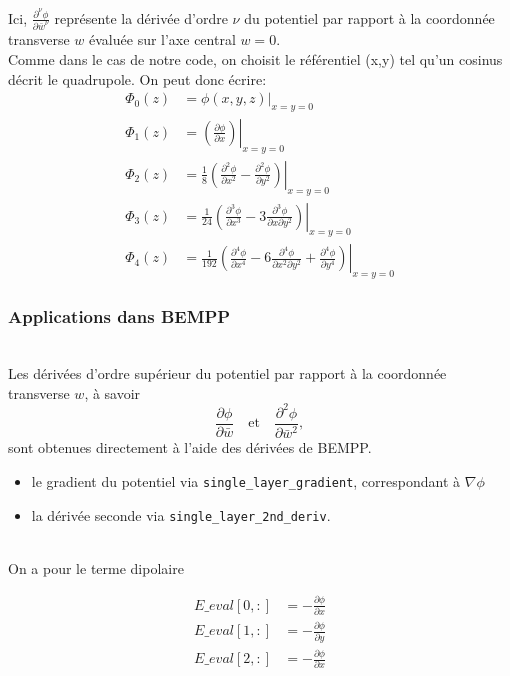 \documentclass{report}
\begin{document}
Ici, $\frac{\partial^{\nu} \phi}{\partial \bar w^{\nu}}$ représente la dérivée d'ordre $\nu$ du potentiel par rapport à la coordonnée transverse $w$ évaluée sur l'axe central $w=0$.  
\
\\
Comme dans le cas de notre code, on choisit le référentiel (x,y) tel qu'un cosinus décrit le quadrupole. On peut donc écrire:
\\
\[
\begin{aligned}
\Phi_0(z) &= \phi(x,y,z)\big|_{x=y=0} \\[1em]
\Phi_1(z) &=\left.\left(\frac{\partial \phi}{\partial x}\right)\right|_{x=y=0} \\[1em]
\Phi_2(z) &=\left.\frac{1}{8}\left(\frac{\partial^{2} \phi}{\partial x^{2}}-\frac{\partial^{2} \phi}{\partial y^{2}}\right)\right|_{x=y=0} \\[1em]
\Phi_3(z) &=\left.\frac{1}{24}\left(\frac{\partial^{3} \phi}{\partial x^{3}}-3 \frac{\partial^{3} \phi}{\partial x \partial y^{2}}\right)\right|_{x=y=0} \\[1em]
\Phi_4(z) &=\left.\frac{1}{192}\left(\frac{\partial^{4} \phi}{\partial x^{4}}-6 \frac{\partial^{4} \phi}{\partial x^{2} \partial y^{2}}+\frac{\partial^{4} \phi}{\partial y^{4}}\right)\right|_{x=y=0}
\end{aligned}
\]
\subsubsection{Applications dans BEMPP}
\
\\
Les dérivées d’ordre supérieur du potentiel par rapport à la coordonnée transverse $w$, à savoir
\[
\frac{\partial \phi}{\partial \bar w}
\quad \text{et} \quad
\frac{\partial^2 \phi}{\partial \bar w^2},
\]
sont obtenues directement à l’aide des dérivées de BEMPP.
\
\\
\begin{itemize}
  \item le gradient du potentiel via \texttt{single\_layer\_gradient}, correspondant à $\nabla \phi$ 
  \item la dérivée seconde via \texttt{single\_layer\_2nd\_deriv}.
\end{itemize}
\
\\
On a pour le terme dipolaire 

\begin{align*}
E\_eval[0, :]  &= -\frac{\partial \phi}{\partial x} \\
E\_eval[1, :]  &= -\frac{\partial \phi}{\partial y }\\
E\_eval[2, :]  &= -\frac{\partial \phi}{\partial x }\\
\end{align*}
\end{document}
